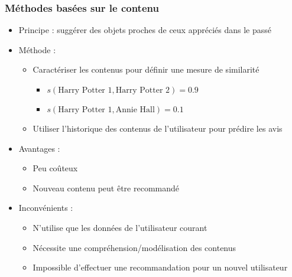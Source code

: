 \documentclass[c]{beamer}
\begin{document}
\begin{frame}
    \frametitle{M\'ethodes bas\'ees sur le contenu}

    \begin{itemize}
        \item Principe : sugg\'erer des objets proches de ceux appr\'eci\'es
            dans le pass\'e
        \item<2-> M\'ethode :
            \begin{itemize}
                \item Caract\'eriser les contenus pour d\'efinir une mesure de
                    similarit\'e
                    \begin{itemize}
                        \item $s(\text{Harry Potter 1}, \text{Harry Potter 2}) = 0.9$
                        \item $s(\text{Harry Potter 1}, \text{Annie Hall}) = 0.1$
                    \end{itemize}
                \item Utiliser l'historique des contenus de
                l'utilisateur pour pr\'edire les avis
            \end{itemize}
        \item<3-> Avantages :
            \begin{itemize}
                \item Peu coûteux
                \item Nouveau contenu peut être recommand\'e
            \end{itemize}
        \item<4-> Inconv\'enients :
            \begin{itemize}
                \item N'utilise que les donn\'ees de l'utilisateur courant
                \item N\'ecessite une compr\'ehension/mod\'elisation des contenus
                \item Impossible d'effectuer une recommandation pour un
                    nouvel utilisateur
            \end{itemize}
    \end{itemize}
\end{frame}
\end{document}

